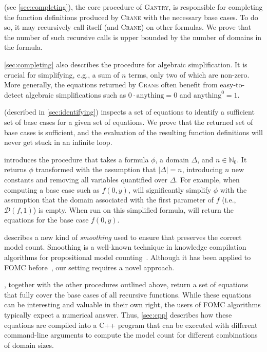 \documentclass[a4paper,UKenglish,cleveref, autoref, thm-restate]{lipics-v2021}
\newcommand{\Cranetwo}{\textsc{Gantry}}
\begin{document}
\CompileWithBaseCases (see \cref{sec:completing}), the core procedure of
\Cranetwo{}, is responsible for completing the function definitions produced by
\textsc{Crane} with the necessary base cases. To do so, it may recursively call
itself (and \textsc{Crane}) on other formulas. We prove that the number of such
recursive calls is upper bounded by the number of domains in the formula.

\cref{sec:completing} also describes the \Simplify procedure for algebraic
simplification. It is crucial for simplifying, e.g., a sum of $n$ terms, only
two of which are non-zero. More generally, the equations returned by
\textsc{Crane} often benefit from easy-to-detect algebraic simplifications such
as $0 \cdot \text{anything} = 0$ and $\text{anything}^{0} = 1$.

\FindBaseCases (described in \cref{sec:identifying}) inspects a set of equations
to identify a sufficient set of base cases for a given set of equations. We
prove that the returned set of base cases is sufficient, and the evaluation of
the resulting function definitions will never get stuck in an infinite loop.

 introduces the \Propagate procedure that takes a formula
$\phi$, a domain $\Delta$, and $n \in \mathbb{N}_{0}$. It returns $\phi$
transformed with the assumption that $|\Delta| = n$, introducing $n$ new
constants and removing all variables quantified over $\Delta$. For example, when
computing a base case such as $f(0, y)$, \Propagate will significantly simplify
$\phi$ with the assumption that the domain associated with the first parameter
of $f$ (i.e., $\mathcal{D}(f, 1)$) is empty. When run on this simplified
formula, \CompileWithBaseCases will return the equations for the base case
$f(0, y)$.

 describes a new kind of \emph{smoothing} used to ensure
that \Propagate preserves the correct model count. Smoothing is a well-known
technique in knowledge compilation algorithms for propositional model
counting~\cite{darwiche2001tractable}. Although it has been applied to FOMC
before~\cite{DBLP:conf/ijcai/BroeckTMDR11}, our setting requires a novel
approach.

\CompileWithBaseCases, together with the other procedures outlined above, return
a set of equations that fully cover the base cases of all recursive functions.
While these equations can be interesting and valuable in their own right, the
users of FOMC algorithms typically expect a numerical answer. Thus,
\cref{sec:cpp} describes how these equations are compiled into a C++ program
that can be executed with different command-line arguments to compute the model
count for different combinations of domain sizes.
\end{document}

